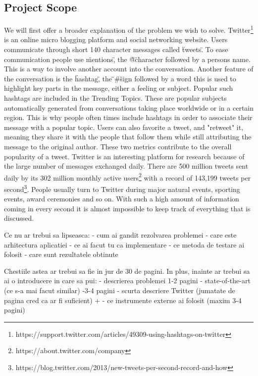 \subsection{Project Scope}
\label{sub-sec:proj-scope}

We will first offer a broader explanation of the problem we wish to solve.
\newline
Twitter\footnote{https://support.twitter.com/articles/49309-using-hashtags-on-twitter} is an online micro blogging platform and social networking website. Users communicate through short 140 character messages called \"tweets\". To ease communication people use \"mentions\", the \"@\" character followed by a persons name. This is a way to involve another account into the conversation. Another feature of the conversation is the \"hashtag\", the \"#\" sign followed by a word this is used to highlight key parts in the message, either a feeling or subject. Popular such hashtags are included in the Trending Topics. These are popular subjects automatically generated from conversations taking place worldwide or in a certain region. This is why people often times include hashtags in order to associate their message with a popular topic. Users can also favorite a tweet, and "retweet" it, meaning they share it with the people that follow them while still attributing the message to the original author. These two metrics contribute to the overall popularity of a tweet.
\newline
Twitter is an interesting platform for research because of the large number of messages exchanged daily. There are 500 million tweets sent daily by its 302 million monthly active users\footnote{https://about.twitter.com/company} with a record of 143,199 tweets per second\footnote{https://blog.twitter.com/2013/new-tweets-per-second-record-and-how}. People usually turn to Twitter during major natural events, sporting events, award ceremonies and so on. With such a high amount of information coming in every second it is almost impossible to keep track of everything that is discussed.

Ce nu ar trebui sa lipseasca: 
- cum ai gandit rezolvarea problemei
- care este arhitectura aplicatiei
- ce ai facut tu ca implementare
- ce metoda de testare ai folosit
- care sunt rezultatele obtinute

Chestiile astea ar trebui sa fie in jur de 30 de pagini. In plus, inainte ar trebui sa ai o introducere in care sa pui:
- descrierea problemei 1-2 pagini
- state-of-the-art (ce s-a mai facut similar) -3-4 pagini
- scurta descriere Twitter (jumatate de pagina cred ca ar fi suficient) + - ce instrumente externe ai folosit (maxim 3-4 pagini)

